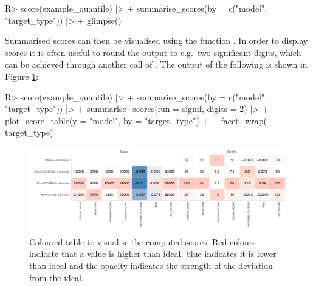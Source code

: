 \documentclass[
]{jss}
\begin{document}
\begin{CodeChunk}
\begin{CodeInput}
R> score(example_quantile) |>
+   summarise_scores(by = c("model", "target_type")) |>
+   glimpse()
\end{CodeInput}
\end{CodeChunk}

Summarised scores can then be visualised using the function
. In order to display scores it is often useful to
round the output to e.g.~two significant digits, which can be achieved
through another call of . The output of the
following is shown in Figure \ref{fig:score-table}:

\begin{CodeChunk}
\begin{CodeInput}
R> score(example_quantile) |>
+   summarise_scores(by = c("model", "target_type")) |>
+   summarise_scores(fun = signif, digits = 2) |>
+   plot_score_table(y = "model", by = "target_type") + 
+   facet_wrap(~ target_type)
\end{CodeInput}
\begin{figure}

{\centering \includegraphics[width=1\linewidth]{manuscript_files/figure-latex/score-table-1} 

}

\caption[Coloured table to visualise the computed scores]{Coloured table to visualise the computed scores. Red colours indicate that a value is higher than ideal, blue indicates it is lower than ideal and the opacity indicates the strength of the deviation from the ideal.}\label{fig:score-table}
\end{figure}
\end{CodeChunk}
\end{document}

